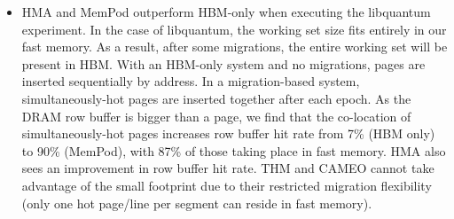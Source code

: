 \begin{itemize}
	\item HMA and MemPod outperform HBM-only when executing the libquantum experiment. In the case of libquantum, the working set size fits entirely in our fast memory. As a result, after some migrations, the entire working set will be present in HBM.  With an HBM-only system and no migrations, pages
are inserted sequentially by address.  In a migration-based system, 
simultaneously-hot pages are inserted together after each epoch.  As the
DRAM row buffer is bigger than a page, we find that the co-location of
simultaneously-hot pages increases row buffer hit rate from 7\% (HBM only)
to 90\% (MemPod), with 87\% of those taking place in fast memory.  HMA also sees an improvement in row buffer hit rate. THM and CAMEO cannot take advantage of the small footprint due to their restricted migration flexibility (only one hot page/line per segment can reside in fast memory).
\end{itemize}


